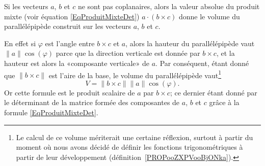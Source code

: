 \begin{normaltext}      \label{NORMooWWOKooWzScnZ}
	Si les vecteurs $a$, $b$ et $c$ ne sont pas coplanaires, alors la valeur absolue du produit mixte (voir équation \eqref{EqProduitMixteDet}) $a\cdot(b\times c)$ donne le volume du parallélépipède construit sur les vecteurs $a$, $b$ et $c$.

	En effet si $\varphi$ est l'angle entre $b\times c$ et $a$, alors la hauteur du parallélépipède vaut $\| a \|\cos(\varphi)$ parce que la direction verticale est donnée par $b\times c$, et la hauteur est alors la «composante verticale» de $a$. Par conséquent, étant donné que $\| b\times c \|$ est l'aire de la base, le volume du parallélépipède vaut\footnote{Le calcul de ce volume mériterait une certaine réflexion, surtout à partir du moment où nous avons décidé de définir les fonctions trigonométriques à partir de leur développement (définition~\ref{PROPooZXPVooBjONka}).}
	\begin{equation}
		V=\| b\times c\|  \| a \|\cos(\varphi).
	\end{equation}
	Or cette formule est le produit scalaire de $a$ par $b \times c$; ce dernier étant donné par le déterminant de la matrice formée des composantes de $a$, $b$ et $c$ grâce à la formule \eqref{EqProduitMixteDet}.
\end{normaltext}

